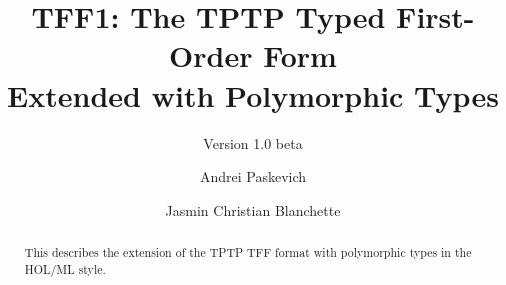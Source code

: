 \documentclass[draft,a4paper]{llncs}
\begin{document}
\title{
TFF1: The TPTP Typed First-Order Form \\ Extended with Polymorphic Types}
\subtitle{Version 1.0 beta}

\author{
Andrei Paskevich \and Jasmin Christian Blanchette
}


\maketitle

\begin{abstract}
This \paper{} describes the extension of the TPTP TFF format with polymorphic
types in the HOL/ML style.
\end{abstract}












\end{document}
